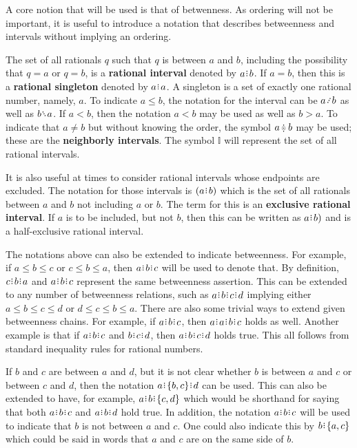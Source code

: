 \documentclass[12pt]{article}
\begin{document}
A core notion that will be used is that of betwenness. As ordering will not be important, it is useful to introduce a notation that describes betweenness and intervals without implying an ordering. 

The set of all rationals $q$ such that $q$ is between $a$ and $b$, including the possibility that $q=a$ or $q=b$, is a \textbf{rational interval} denoted by $a\rint b$.  If $a=b$, then this is a \textbf{rational singleton} denoted by $a\rint a$. A singleton is a set of exactly one rational number, namely, $a$. To indicate $a \leq b$, the notation for the interval can be $a \lte b$ as well as $b \gte a$. If $a < b$, then the notation $a \lt b$ may be used as well as $b \gt a$. To indicate that $a \neq b$ but without knowing the order, the symbol $a \betneq b$ may be used; these are the \textbf{neighborly intervals}. The symbol $\mathbb{I}$ will represent the set of all rational intervals. 

It is also useful at times to consider rational intervals whose endpoints are excluded. The notation for those intervals is $(a \rint b)$ which is the set of all rationals between $a$ and $b$ not including $a$ or $b$. The term for this is an \textbf{exclusive rational interval}. If $a$ is to be included, but not $b$, then this can be written as $a\rint b)$ and is a half-exclusive rational interval. 

The notations above can also be extended to indicate betweenness. For example, if $a \leq b \leq c$ or $c \leq b \leq a$, then $a\rint b\rint c$ will be used to denote that. By definition, $c\rint b\rint a$ and $a\rint b\rint c$ represent the same betweenness assertion. This can be extended to any number of betweenness relations, such as $a\rint b\rint c\rint d$ implying either $a \leq b \leq c \leq d$ or $d \leq c \leq b \leq a$. There are also some trivial ways to extend given betweenness chains. For example, if $a\rint b\rint c$, then $a\rint a\rint b\rint c$ holds as well. Another example is that if $a\rint b\rint c$ and $b\rint c\rint d$, then $a\rint b\rint c\rint d$ holds true. This all follows from standard inequality rules for rational numbers. 

If $b$ and $c$ are between $a$ and $d$, but it is not clear whether $b$ is between $a$ and $c$ or between $c$ and $d$, then the notation $a\rint \{b,c\}\rint d$ can be used. This can also be extended to have, for example, $a\rint b\rint \{c,d\}$ which would be shorthand for saying that both $a\rint b\rint c$ and $a\rint b\rint d$ hold true. In addition, the notation \sout{$a\rint b\rint c$} will be used to indicate that $b$ is not between $a$ and $c$. One could also indicate this by $b\rint \{a,c\}$ which could be said in words that $a$ and $c$ are on the same side of $b$. 
\end{document}
